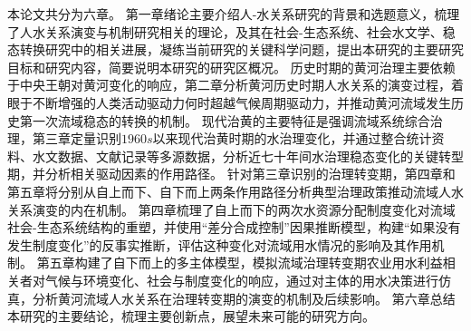 本论文共分为六章。
第一章绪论主要介绍人-水关系研究的背景和选题意义，梳理了人水关系演变与机制研究相关的理论，及其在社会-生态系统、社会水文学、稳态转换研究中的相关进展，凝练当前研究的关键科学问题，提出本研究的主要研究目标和研究内容，简要说明本研究的研究区概况。
历史时期的黄河治理主要依赖于中央王朝对黄河变化的响应，第二章分析黄河历史时期人水关系的演变过程，着眼于不断增强的人类活动驱动力何时超越气候周期驱动力，并推动黄河流域发生历史第一次流域稳态的转换的机制。
现代治黄的主要特征是强调流域系统综合治理，第三章定量识别$1960s$以来现代治黄时期的水治理变化，并通过整合统计资料、水文数据、文献记录等多源数据，分析近七十年间水治理稳态变化的关键转型期，并分析相关驱动因素的作用路径。
针对第三章识别的治理转变期，第四章和第五章将分别从自上而下、自下而上两条作用路径分析典型治理政策推动流域人水关系演变的内在机制。
第四章梳理了自上而下的两次水资源分配制度变化对流域社会-生态系统结构的重塑，并使用“差分合成控制”因果推断模型，构建“如果没有发生制度变化”的反事实推断，评估这种变化对流域用水情况的影响及其作用机制。
第五章构建了自下而上的多主体模型，模拟流域治理转变期农业用水利益相关者对气候与环境变化、社会与制度变化的响应，通过对主体的用水决策进行仿真，分析黄河流域人水关系在治理转变期的演变的机制及后续影响。
第六章总结本研究的主要结论，梳理主要创新点，展望未来可能的研究方向。